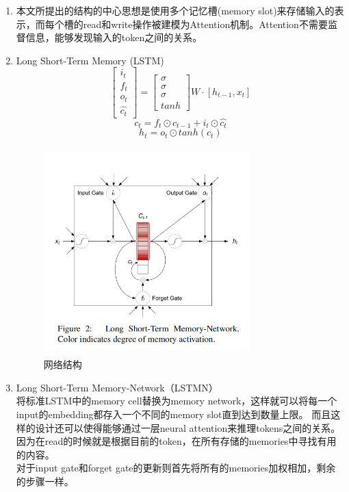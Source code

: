 \documentclass[a4paper,UTF8]{article}
\numberwithin{equation}{section}
\begin{document}
\begin{enumerate}
    \item 本文所提出的结构的中心思想是使用多个记忆槽(memory slot)来存储输入的表示，而每个槽的read和write操作被建模为Attention机制。Attention不需要监督信息，能够发现输入的token之间的关系。
    \item Long Short-Term Memory (LSTM)$$ \begin{bmatrix}
        i_t\\ 
        f_t\\ 
        o_t\\
        \hat{c_t}
        \end{bmatrix} = \begin{bmatrix}
            \sigma\\ 
            \sigma\\ 
            \sigma\\
            tanh
            \end{bmatrix}W\cdot[h_{t-1},x_t]$$
            $$c_t = f_t \odot c_{t-1}+i_t \odot \hat{c_t}$$
            $$ h_t = o_t \odot tanh(c_t)$$
            \begin{figure}[H]
                \centering
                \includegraphics[width=8cm,height=8cm]{6-1.png}
                \caption{网络结构}
            \end{figure}
    \item Long Short-Term Memory-Network（LSTMN）\\将标准LSTM中的memory cell替换为memory network，这样就可以将每一个input的embedding都存入一个不同的memory slot直到达到数量上限。
    而且这样的设计还可以使得能够通过一层neural attention来推理tokens之间的关系。因为在read的时候就是根据目前的token，在所有存储的memories中寻找有用的内容。\\
    对于input gate和forget gate的更新则首先将所有的memories加权相加，剩余的步骤一样。

\end{enumerate}
\end{document}
